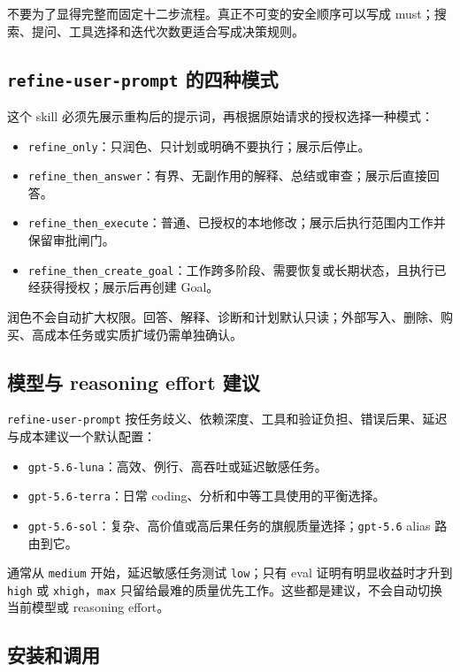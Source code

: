 \documentclass[UTF8,a4paper,11pt,fontset=none]{ctexart}
\newcommand{\skill}[1]{\texttt{#1}}
\begin{document}
不要为了显得完整而固定十二步流程。真正不可变的安全顺序可以写成 must；搜索、提问、工具选择和迭代次数更适合写成决策规则。

\subsection{\skill{refine-user-prompt} 的四种模式}

这个 skill 必须先展示重构后的提示词，再根据原始请求的授权选择一种模式：

\begin{itemize}
  \item \skill{refine\_only}：只润色、只计划或明确不要执行；展示后停止。
  \item \skill{refine\_then\_answer}：有界、无副作用的解释、总结或审查；展示后直接回答。
  \item \skill{refine\_then\_execute}：普通、已授权的本地修改；展示后执行范围内工作并保留审批闸门。
  \item \skill{refine\_then\_create\_goal}：工作跨多阶段、需要恢复或长期状态，且执行已经获得授权；展示后再创建 Goal。
\end{itemize}

润色不会自动扩大权限。回答、解释、诊断和计划默认只读；外部写入、删除、购买、高成本任务或实质扩域仍需单独确认。

\subsection{模型与 reasoning effort 建议}

\skill{refine-user-prompt} 按任务歧义、依赖深度、工具和验证负担、错误后果、延迟与成本建议一个默认配置：

\begin{itemize}
  \item \skill{gpt-5.6-luna}：高效、例行、高吞吐或延迟敏感任务。
  \item \skill{gpt-5.6-terra}：日常 coding、分析和中等工具使用的平衡选择。
  \item \skill{gpt-5.6-sol}：复杂、高价值或高后果任务的旗舰质量选择；\skill{gpt-5.6} alias 路由到它。
\end{itemize}

通常从 \skill{medium} 开始，延迟敏感任务测试 \skill{low}；只有 eval 证明有明显收益时才升到 \skill{high} 或 \skill{xhigh}，\skill{max} 只留给最难的质量优先工作。这些都是建议，不会自动切换当前模型或 reasoning effort。

\subsection{安装和调用}
\end{document}
